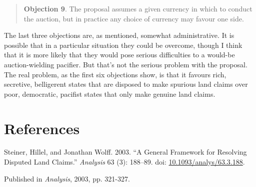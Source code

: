 \documentclass[
  10pt,
  letterpaper,
  DIV=11,
  numbers=noendperiod,
  twoside]{scrartcl}
\newlength{\cslhangindent}
\newenvironment{CSLReferences}[2] %
 {\begin{list}{}{%
  \setlength{\itemindent}{0pt}
  \setlength{\leftmargin}{0pt}
  \setlength{\parsep}{0pt}
  \ifodd #1
   \setlength{\leftmargin}{\cslhangindent}
   \setlength{\itemindent}{-1\cslhangindent}
  \fi
  \setlength{\itemsep}{#2\baselineskip}}}
 {\end{list}}
\begin{document}
\begin{quote}
\textbf{Objection 9}. The proposal assumes a given currency in which to
conduct the auction, but in practice any choice of currency may favour
one side.
\end{quote}

The last three objections are, as mentioned, somewhat administrative. It
is possible that in a particular situation they could be overcome,
though I think that it is more likely that they would pose serious
difficulties to a would-be auction-wielding pacifier. But that's not the
serious problem with the proposal. The real problem, as the first six
objections show, is that it favours rich, secretive, belligerent states
that are disposed to make spurious land claims over poor, democratic,
pacifist states that only make genuine land claims.

\section*{References}\label{references}

\label{refs}
\begin{CSLReferences}{1}{0}
Steiner, Hillel, and Jonathan Wolff. 2003. {``A General Framework for
Resolving Disputed Land Claims.''} \emph{Analysis} 63 (3): 188--89. doi:
\href{https://doi.org/10.1093/analys/63.3.188}{10.1093/analys/63.3.188}.

\end{CSLReferences}



\noindent Published in\emph{
Analysis}, 2003, pp. 321-327.
\end{document}
